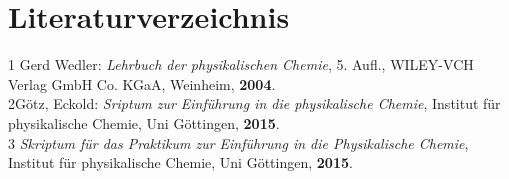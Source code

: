 \documentclass[12pt,a4paper,titlepage,headinclude,bibtotoc]{scrartcl}
\begin{document}
\newpage

\section{Literaturverzeichnis}
\begin{flushleft}
1 \quad Gerd Wedler: \emph{Lehrbuch der physikalischen Chemie}, 5. Aufl., WILEY-VCH Verlag GmbH Co. KGaA, Weinheim, \textbf{2004}.\\
\vspace{0,5 cm}
2\quad Götz, Eckold: \emph{Sriptum zur Einführung in die physikalische Chemie}, Institut für physikalische Chemie, Uni Göttingen, \textbf{2015}.\\
\vspace{0,5 cm}
3 \quad \emph{Skriptum für das Praktikum zur Einführung in die Physikalische Chemie}, Institut für physikalische Chemie, Uni Göttingen, \textbf{2015}.\\
\end{flushleft}
\end{document}
